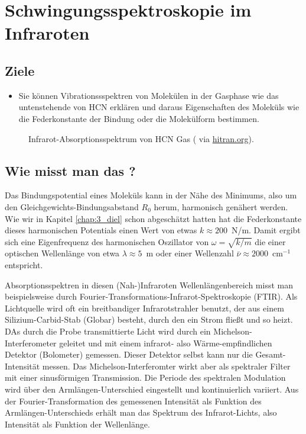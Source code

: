 
\chapter{Schwingungsspektroskopie im Infraroten}

\label{chap:vib}


\section{Ziele}

\begin{itemize}
\item Sie können Vibrationssspektren von Molekülen in der Gasphase wie das untenstehende von HCN erklären und daraus Eigenschaften des Moleküls wie die  Federkonstante der Bindung oder die  Molekülform bestimmen.
\end{itemize}


\begin{figure}
\caption{Infrarot-Absorptionsspektrum von HCN Gas  (\cite{Maki_1995_HCN} via \href{https://hitran.org}{hitran.org}).
\label{fig:vib_hcn}}
\end{figure}



\section{Wie misst man das ?}

Das Bindungspotential eines Moleküls kann in der Nähe des Minimums, also um den Gleichgewichts-Bindungsabstand $R_0$ herum, harmonisch genähert werden.
Wie wir in Kapitel \ref{chap:3_diel} schon abgeschätzt hatten hat die Federkonstante dieses harmonischen Potentials einen Wert von etwas $k \approx 200$~N/m. Damit ergibt sich eine Eigenfrequenz des harmonischen Oszillator von $\omega = \sqrt{k / m}$ die einer optischen Wellenlänge von etwa $\lambda \approx 5$~\textmu m oder einer Wellenzahl $\bar{\nu} \approx 2000$~cm$^{-1}$ entspricht. 

Absorptionsspektren in diesen (Nah-)Infraroten Wellenlängenbereich misst man beispielsweise durch Fourier-Transformations-Infrarot-Spektroskopie (FTIR). Als Lichtquelle wird oft ein breitbandiger Infrarotstrahler benutzt, der aus einem Silizium-Carbid-Stab (Globar) besteht, durch den ein Strom fließt und so heizt. DAs durch die Probe transmittierte Licht wird durch ein Michelson-Interferometer geleitet und mit einem infrarot-  also Wärme-empfindlichen Detektor (Bolometer) gemessen. Dieser Detektor selbst kann nur die Gesamt-Intensität messen. Das Michelson-Interferomter wirkt aber als spektraler Filter mit einer sinusförmigen Transmission. Die Periode des spektralen Modulation wird über den Armlängen-Unterschied eingestellt und kontinuierlich variiert. Aus der Fourier-Transformation des gemessenen Intensität als Funktion des Armlängen-Unterschieds erhält man das Spektrum des Infrarot-Lichts, also Intensität als Funktion der Wellenlänge.



